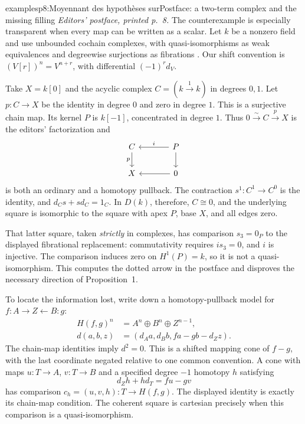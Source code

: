 \begin{dcomment}{examples}{p8:Moyennant des hypothèses sur}{Postface: a two-term complex and the missing filling}
\emph{Editors' postface, printed p.~8.}
The counterexample is especially transparent when every map can be written as a scalar. Let $k$ be a nonzero field and use unbounded cochain complexes, with quasi-isomorphisms as weak equivalences and degreewise surjections as fibrations \citep[Theorem~2.3.11, with degrees reversed]{Hovey1999ModelCategories}. Our shift convention is $(V[r])^n=V^{n+r}$, with differential $(-1)^r d_V$.

Take $X=k[0]$ and the acyclic complex $C=(k\xrightarrow{1}k)$ in degrees $0,1$. Let $p:C\to X$ be the identity in degree $0$ and zero in degree $1$. This is a surjective chain map. Its kernel $P$ is $k[-1]$, concentrated in degree $1$. Thus $0\xrightarrow{\sim}C\xrightarrow pX$ is the editors' factorization and
\[
\begin{tikzcd}[column sep=large]
C\ar[d,"p"'] & P\ar[l,"i"']\ar[d]\\
X & 0\ar[l]
\end{tikzcd}
\]
is both an ordinary and a homotopy pullback. The contraction $s^1:C^1\to C^0$ is the identity, and $d_Cs+sd_C=1_C$. In $D(k)$, therefore, $C\cong0$, and the underlying square is isomorphic to the square with apex $P$, base $X$, and all edges zero.

That latter square, taken \emph{strictly} in complexes, has comparison $s_3=0_P$ to the displayed fibrational replacement: commutativity requires $is_3=0$, and $i$ is injective. The comparison induces zero on $H^1(P)=k$, so it is not a quasi-isomorphism. This computes the dotted arrow in the postface and disproves the necessary direction of Proposition~1.

To locate the information lost, write down a homotopy-pullback model for $f:A\to Z\leftarrow B:g$:
\[
\begin{split}
H(f,g)^n&=A^n\oplus B^n\oplus Z^{n-1},\\
d(a,b,z)&=(d_Aa,d_Bb,fa-gb-d_Zz).
\end{split}
\]
The chain-map identities imply $d^2=0$. This is a shifted mapping cone of $f-g$, with the last coordinate negated relative to one common convention. A cone with maps $u:T\to A$, $v:T\to B$ and a specified degree $-1$ homotopy $h$ satisfying
\[
 d_Zh+hd_T=fu-gv
\]
has comparison $c_h=(u,v,h):T\to H(f,g)$. The displayed identity is exactly its chain-map condition. The coherent square is cartesian precisely when this comparison is a quasi-isomorphism.


\end{dcomment}
